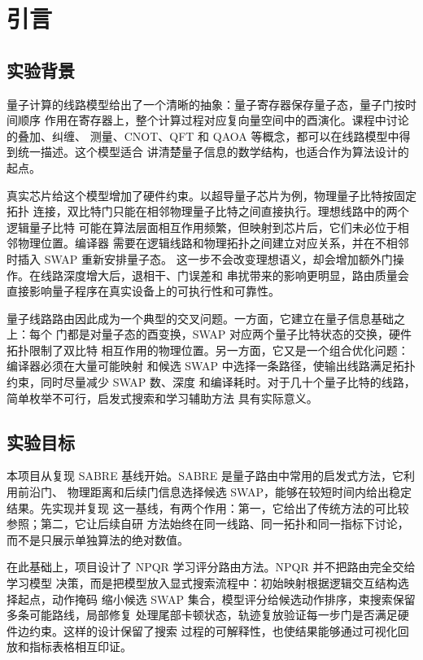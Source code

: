 \section{引言}

\subsection{实验背景}

量子计算的线路模型给出了一个清晰的抽象：量子寄存器保存量子态，量子门按时间顺序
作用在寄存器上，整个计算过程对应复向量空间中的酉演化。课程中讨论的叠加、纠缠、
测量、CNOT、QFT 和 QAOA 等概念，都可以在线路模型中得到统一描述。这个模型适合
讲清楚量子信息的数学结构，也适合作为算法设计的起点。

真实芯片给这个模型增加了硬件约束。以超导量子芯片为例，物理量子比特按固定拓扑
连接，双比特门只能在相邻物理量子比特之间直接执行。理想线路中的两个逻辑量子比特
可能在算法层面相互作用频繁，但映射到芯片后，它们未必位于相邻物理位置。编译器
需要在逻辑线路和物理拓扑之间建立对应关系，并在不相邻时插入 SWAP 重新安排量子态。
这一步不会改变理想语义，却会增加额外门操作。在线路深度增大后，退相干、门误差和
串扰带来的影响更明显，路由质量会直接影响量子程序在真实设备上的可执行性和可靠性。

量子线路路由因此成为一个典型的交叉问题。一方面，它建立在量子信息基础之上：每个
门都是对量子态的酉变换，SWAP 对应两个量子比特状态的交换，硬件拓扑限制了双比特
相互作用的物理位置。另一方面，它又是一个组合优化问题：编译器必须在大量可能映射
和候选 SWAP 中选择一条路径，使输出线路满足拓扑约束，同时尽量减少 SWAP 数、深度
和编译耗时。对于几十个量子比特的线路，简单枚举不可行，启发式搜索和学习辅助方法
具有实际意义。

\subsection{实验目标}

本项目从复现 SABRE 基线开始。SABRE 是量子路由中常用的启发式方法，它利用前沿门、
物理距离和后续门信息选择候选 SWAP，能够在较短时间内给出稳定结果。先实现并复现
这一基线，有两个作用：第一，它给出了传统方法的可比较参照；第二，它让后续自研
方法始终在同一线路、同一拓扑和同一指标下讨论，而不是只展示单独算法的绝对数值。

在此基础上，项目设计了 NPQR 学习评分路由方法。NPQR 并不把路由完全交给学习模型
决策，而是把模型放入显式搜索流程中：初始映射根据逻辑交互结构选择起点，动作掩码
缩小候选 SWAP 集合，模型评分给候选动作排序，束搜索保留多条可能路线，局部修复
处理尾部卡顿状态，轨迹复放验证每一步门是否满足硬件边约束。这样的设计保留了搜索
过程的可解释性，也使结果能够通过可视化回放和指标表格相互印证。


